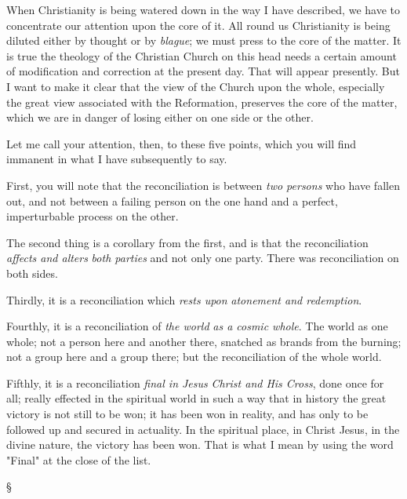 \documentclass[12pt,letterpaper,oneside]{book}
\begin{document}
When Christianity is being watered down in 
the way I have described, we have to concentrate 
our attention upon the core of it. All 
round us Christianity is being diluted either 
by thought or by \textit{blague}; we must press to the 
core of the matter. It is true the theology of 
the Christian Church on this head needs a 
certain amount of modification and correction 
at the present day. That will appear presently. 
But I want to make it clear that the view of 
the Church upon the whole, especially the 
great view associated with the Reformation, 
preserves the core of the matter, which we 
are in danger of losing either on one side or 
the other. 

Let me call your attention, then, to these 
five points, which you will find immanent in 
what I have subsequently to say. 

First, you will note that the reconciliation is 
between \textit{two persons} who have fallen out, and 
not between a failing person on the one hand 
and a perfect, imperturbable process on the 
other. 

The second thing is a corollary from the first, 
and is that the reconciliation \textit{affects and alters} 
\textit{both parties} and not only one party. There 
was reconciliation on both sides. 

Thirdly, it is a reconciliation which \textit{rests upon} 
\textit{atonement and redemption}. 

Fourthly, it is a reconciliation of \textit{the world} 
\textit{as a cosmic whole}. The world as one whole; 
not a person here and another there, snatched 
as brands from the burning; not a group here 
and a group there; but the reconciliation of 
the whole world. 

Fifthly, it is a reconciliation \textit{final in Jesus} 
\textit{Christ and His Cross}, done once for all; really 
effected in the spiritual world in such a way 
that in history the great victory is not still to 
be won; it has been won in reality, and has 
only to be followed up and secured in actuality. 
In the spiritual place, in Christ Jesus, 
in the divine nature, the victory has been 
won. That is what I mean by using the 
word "Final" at the close of the list. 

\begin{center}
\S
\end{center}
\end{document}
